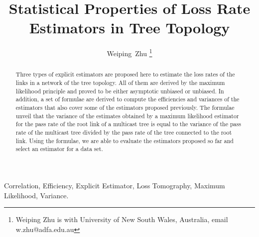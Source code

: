 \documentclass[10pt,onecolumn]{IEEEtran}
\begin{document}



\setlength{\parindent}{1pc}




\title{Statistical Properties of Loss Rate Estimators in  Tree Topology}
\author{Weiping~Zhu  \thanks{Weiping Zhu is with University of New South Wales, Australia, email w.zhu@adfa.edu.au}}
\date{}
\maketitle


\begin{abstract} Three types of explicit estimators are proposed here to estimate the loss rates of the links in a network of the tree topology. All of them are derived by the maximum likelihood principle and proved to be either asymptotic unbiased or unbiased. In addition,  a set of formulae are derived to compute the efficiencies and variances of the estimators that also cover some of  the estimators proposed previously. The formulae unveil that the variance of the estimates obtained by a maximum likelihood estimator for the pass rate of the root link of a multicast tree is equal to the variance of the pass rate of the multicast tree divided by the pass rate of the tree connected to the root link. Using the formulae, we are able to evaluate the estimators proposed so far and select an estimator for a data set.

\end{abstract}

\begin{IEEEkeywords}
Correlation, Efficiency, Explicit Estimator, Loss Tomography, Maximum Likelihood, Variance.
\end{IEEEkeywords}
\end{document}
